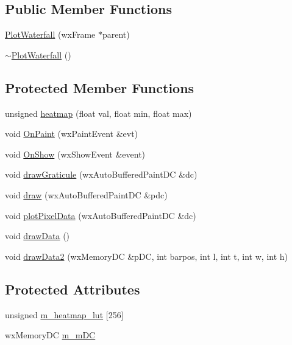 \subsection*{Public Member Functions}
\begin{DoxyCompactItemize}
\item 
\hyperlink{class_plot_waterfall_ab8cb1de06d17616f05ab872923563167}{Plot\-Waterfall} (wx\-Frame $\ast$parent)
\item 
\hyperlink{class_plot_waterfall_a88df0c144df49b4e8d6a72a8e3a6099d}{$\sim$\-Plot\-Waterfall} ()
\end{DoxyCompactItemize}
\subsection*{Protected Member Functions}
\begin{DoxyCompactItemize}
\item 
unsigned \hyperlink{class_plot_waterfall_a9258386bf42d94ddda768e4e767a77aa}{heatmap} (float val, float min, float max)
\item 
void \hyperlink{class_plot_waterfall_a37d541349ac6f010a90fee3b9f32fbbb}{On\-Paint} (wx\-Paint\-Event \&evt)
\item 
void \hyperlink{class_plot_waterfall_ad55e0e3078f0d5c3699df36ba6d8ab5d}{On\-Show} (wx\-Show\-Event \&event)
\item 
void \hyperlink{class_plot_waterfall_aa97d243b7bb91238b7493dcb96139803}{draw\-Graticule} (wx\-Auto\-Buffered\-Paint\-D\-C \&dc)
\item 
void \hyperlink{class_plot_waterfall_a86c6b3a9dc720b681f7b4e47d1fe193d}{draw} (wx\-Auto\-Buffered\-Paint\-D\-C \&pdc)
\item 
void \hyperlink{class_plot_waterfall_aec560c10f32a6c6e92a62225288c28f3}{plot\-Pixel\-Data} (wx\-Auto\-Buffered\-Paint\-D\-C \&dc)
\item 
void \hyperlink{class_plot_waterfall_aeb0731ac7eeecd219980637ac70b4c76}{draw\-Data} ()
\item 
void \hyperlink{class_plot_waterfall_a6825ebbd247988bf052d29ebca72d02e}{draw\-Data2} (wx\-Memory\-D\-C \&p\-D\-C, int barpos, int l, int t, int w, int h)
\end{DoxyCompactItemize}
\subsection*{Protected Attributes}
\begin{DoxyCompactItemize}
\item 
unsigned \hyperlink{class_plot_waterfall_aae04482318331ac760954376f23a1e3c}{m\-\_\-heatmap\-\_\-lut} \mbox{[}256\mbox{]}
\item 
wx\-Memory\-D\-C \hyperlink{class_plot_waterfall_a1b80aa40a1194ece27c87ec265ef7d2c}{m\-\_\-m\-D\-C}
\end{DoxyCompactItemize}
